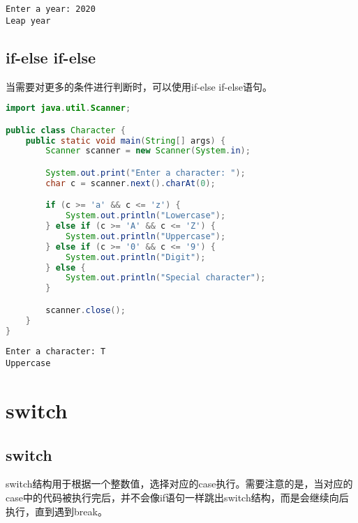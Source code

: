 \begin{tcolorbox}
	\begin{verbatim}
Enter a year: 2020
Leap year
\end{verbatim}
\end{tcolorbox}

\vspace{0.5cm}

\subsection{if-else if-else}

当需要对更多的条件进行判断时，可以使用if-else if-else语句。\\


\begin{lstlisting}[language=Java]
import java.util.Scanner;

public class Character {
	public static void main(String[] args) {
		Scanner scanner = new Scanner(System.in);

		System.out.print("Enter a character: ");
		char c = scanner.next().charAt(0);

		if (c >= 'a' && c <= 'z') {
			System.out.println("Lowercase");
		} else if (c >= 'A' && c <= 'Z') {
			System.out.println("Uppercase");
		} else if (c >= '0' && c <= '9') {
			System.out.println("Digit");
		} else {
			System.out.println("Special character");
		}

		scanner.close();
	}
}	
\end{lstlisting}

\begin{tcolorbox}
	\begin{verbatim}
Enter a character: T
Uppercase
\end{verbatim}
\end{tcolorbox}

\newpage

\section{switch}

\subsection{switch}

switch结构用于根据一个整数值，选择对应的case执行。需要注意的是，当对应的case中的代码被执行完后，并不会像if语句一样跳出switch结构，而是会继续向后执行，直到遇到break。\\

